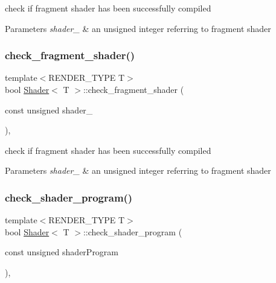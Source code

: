 check if fragment shader has been successfully compiled 


\begin{DoxyParams}{Parameters}
{\em shader\+\_\+} & an unsigned integer referring to fragment shader \\
\hline
\end{DoxyParams}
\mbox{\label{classShader_af80deea033a7fb48bc162b33056bd7a0}} 
\subsubsection{\texorpdfstring{check\+\_\+fragment\+\_\+shader()}{check\_fragment\_shader()}\hspace{0.1cm}{\footnotesize\ttfamily [2/2]}}
{\footnotesize\ttfamily template$<$R\+E\+N\+D\+E\+R\+\_\+\+T\+Y\+PE T$>$ \\
bool \mbox{\hyperlink{classShader}{Shader}}$<$ T $>$\+::check\+\_\+fragment\+\_\+shader (\begin{DoxyParamCaption}\item[{const unsigned}]{shader\+\_\+ }\end{DoxyParamCaption})\hspace{0.3cm}{\ttfamily [inline]}, {\ttfamily [protected]}}



check if fragment shader has been successfully compiled 


\begin{DoxyParams}{Parameters}
{\em shader\+\_\+} & an unsigned integer referring to fragment shader \\
\hline
\end{DoxyParams}
\mbox{\label{classShader_aed672a8004b14078f149603eeb1a3f5a}} 
\subsubsection{\texorpdfstring{check\+\_\+shader\+\_\+program()}{check\_shader\_program()}\hspace{0.1cm}{\footnotesize\ttfamily [1/2]}}
{\footnotesize\ttfamily template$<$R\+E\+N\+D\+E\+R\+\_\+\+T\+Y\+PE T$>$ \\
bool \mbox{\hyperlink{classShader}{Shader}}$<$ T $>$\+::check\+\_\+shader\+\_\+program (\begin{DoxyParamCaption}\item[{const unsigned}]{shader\+Program }\end{DoxyParamCaption})\hspace{0.3cm}{\ttfamily [inline]}, {\ttfamily [protected]}}



